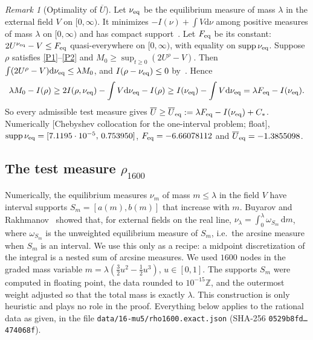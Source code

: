\documentclass[11pt]{article}
\theoremstyle{remark}
\newtheorem{remark}{Remark}
\newcommand{\Z}{\mathbb{Z}}
\newcommand{\Ubar}{\overline{U}}
\newcommand{\dd}{\mathrm{d}}
\newcommand{\file}[1]{\texttt{#1}}
\newcommand{\Cstar}{C_{*}}
\DeclareMathOperator{\supp}{supp}
\begin{document}
\begin{remark}[Optimality of $\Ubar$]\label{rem:Uopt}
Let $\nu_{\rm eq}$ be the equilibrium measure of mass $\lambda$ in the external field $V$ on $[0,\infty)$. It minimizes $-I(\nu)+\int V\dd\nu$ among positive measures of mass $\lambda$ on $[0,\infty)$ and has compact support~\cite[Thm.~I.1.3]{ST}. Let $F_{\rm eq}$ be its constant: $2U^{\nu_{\rm eq}}-V\le F_{\rm eq}$ quasi-everywhere on $[0,\infty)$, with equality on $\supp\nu_{\rm eq}$. Suppose $\rho$ satisfies \ref{P1}--\ref{P2} and $M_0\ge\sup_{t\ge0}(2U^\rho-V)$. Then $\int(2U^\rho-V)\dd\nu_{\rm eq}\le\lambda M_0$, and $I(\rho-\nu_{\rm eq})\le0$ by~\cite[Lemma~6.2]{F}. Hence
\[
\lambda M_0-I(\rho)\ge2I(\rho,\nu_{\rm eq})-\int V\dd\nu_{\rm eq}-I(\rho)\ge I(\nu_{\rm eq})-\int V\dd\nu_{\rm eq}=\lambda F_{\rm eq}-I(\nu_{\rm eq}).
\]
So every admissible test measure gives $\Ubar\ge\Ubar_{\rm eq}:=\lambda F_{\rm eq}-I(\nu_{\rm eq})+\Cstar$. Numerically [Chebyshev collocation for the one-interval problem; float], $\supp\nu_{\rm eq}=[7.1195\cdot10^{-5},\,0.753950]$, $F_{\rm eq}=-6.66078112$ and $\Ubar_{\rm eq}=-1.3855098$.
\end{remark}

\subsection{The test measure $\rho_{1600}$}\label{sec:rho}

Numerically, the equilibrium measures $\nu_m$ of mass $m\le\lambda$ in the field $V$ have interval supports $S_m=[a(m),b(m)]$ that increase with $m$. Buyarov and Rakhmanov~\cite{BR} showed that, for external fields on the real line, $\nu_\lambda=\int_0^\lambda\omega_{S_m}\,\dd m$, where $\omega_{S_m}$ is the unweighted equilibrium measure of $S_m$, i.e.\ the arcsine measure when $S_m$ is an interval. We use this only as a recipe: a midpoint discretization of the integral is a nested sum of arcsine measures. We used $1600$ nodes in the graded mass variable $m=\lambda(\frac32u^2-\frac12u^3)$, $u\in[0,1]$. The supports $S_m$ were computed in floating point, the data rounded to $10^{-15}\Z$, and the outermost weight adjusted so that the total mass is exactly $\lambda$. This construction is only heuristic and plays no role in the proof. Everything below applies to the rational data as given, in the file \file{data/16-mu5/rho1600.exact.json} (SHA-256 \file{0529b8fd\ldots474068f}).
\end{document}

